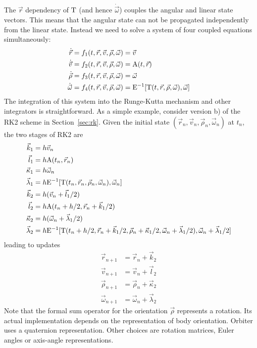 \documentclass[a4paper]{article}
\begin{document}
The $\vec{r}$ dependency of $\mathrm{T}$ (and hence $\dot{\vec\omega}$) couples the angular and linear state vectors. This means that the angular state can not be propagated independently from the linear state. Instead we need to solve a system of four coupled equations simultaneously:
\begin{equation}
\begin{split}
\dot{\vec{r}} &= f_1(t,\vec{r},\vec{v},\vec\rho,\vec\omega) = \vec{v} \\
\dot{\vec{v}} &= f_2(t,\vec{r},\vec{v},\vec\rho,\vec\omega) = \mathrm{A}(t,\vec{r}) \\
\dot{\vec{\rho}} &= f_3(t,\vec{r},\vec{v},\vec\rho,\vec\omega) = \vec\omega \\
\dot{\vec{\omega}} &= f_4(t,\vec{r},\vec{v},\vec\rho,\vec\omega) = \mathrm{E}^{-1}[\mathrm{T}(t,\vec{r},\vec\rho,\vec\omega),\vec\omega]
\end{split}
\end{equation}
The integration of this system into the Runge-Kutta mechanism and other integrators is straightforward. As a simple example, consider version b) of the RK2 scheme in Section~\ref{sec:rk}.
Given the initial state $(\vec{r}_n, \vec{v}_n, \vec\rho_n, \vec\omega_n)$ at $t_n$,
the two stages of RK2 are
\begin{equation}
\begin{split}
\vec{k}_1 &= h\vec{v}_n \\
\vec{l}_1 &= h\mathrm{A}(t_n, \vec{r}_n) \\
\vec{\kappa}_1 &= h\vec\omega_n \\
\vec{\lambda}_1 &= h \mathrm{E}^{-1}[\mathrm{T}(t_n,\vec{r}_n,\vec\rho_n,\vec\omega_n),\vec\omega_n] \\
\vec{k}_2 &= h(\vec{v}_n+\vec{l}_1/2) \\
\vec{l}_2 &= h\mathrm{A}(t_n+h/2, \vec{r}_n+\vec{k}_1/2) \\
\vec\kappa_2 &= h(\vec\omega_n + \vec{\lambda}_1/2) \\
\vec\lambda_2 &= h\mathrm{E}^{-1}[\mathrm{T}(t_n+h/2,\vec{r}_n+\vec{k}_1/2,\vec\rho_n+\vec\kappa_1/2,\vec\omega_n+\vec\lambda_1/2),\vec\omega_n+\vec\lambda_1/2]
\end{split}
\end{equation}
leading to updates
\begin{equation}
\begin{split}
\vec{r}_{n+1} &= \vec{r}_n + \vec{k}_2 \\
\vec{v}_{n+1} &= \vec{v}_n + \vec{l}_2 \\
\vec\rho_{n+1} &= \vec\rho_n + \vec\kappa_2 \\
\vec\omega_{n+1} &= \vec\omega_n + \vec\lambda_2
\end{split}
\end{equation}
Note that the formal sum operator for the orientation $\vec\rho$ represents a rotation. Its actual implementation depends on the representation of body orientation. Orbiter uses a quaternion representation. Other choices are rotation matrices, Euler angles or axis-angle representations.
\end{document}
